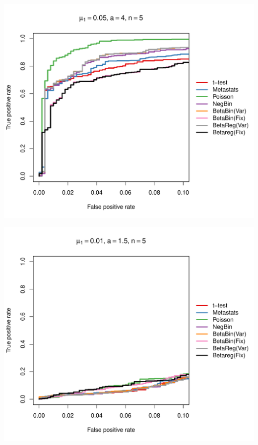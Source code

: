 \documentclass[12pt]{article}\usepackage{graphicx, color}
\makeatletter
\def\maxwidth{ %
  \ifdim\Gin@nat@width>\linewidth
    \linewidth
  \else
    \Gin@nat@width
  \fi
}
\newenvironment{knitrout}{}{} %
\makeatother
\begin{document}
\begin{knitrout}
{\centering \includegraphics[width=\maxwidth]{figure/rocs45} 

}




{\centering \includegraphics[width=\maxwidth]{figure/rocs46} 

}





\end{knitrout}
\end{document}
